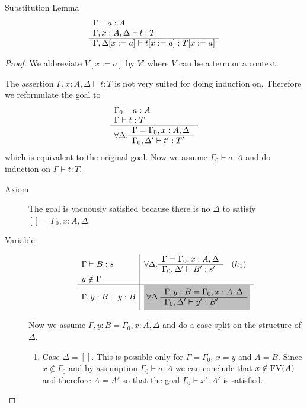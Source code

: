 \documentclass[12pt]{article}
\begin{document}
\begin{theorem} Substitution Lemma
  \label{substitutionlemma}
  $$
  \begin{array}{l}  \Gamma \vdash a:A
    \\
    \Gamma,x:A,\Delta \vdash t:T
   \\ \hline \Gamma,\Delta[x:=a] \vdash t[x:=a] : T[x:=a]\end{array}
  $$
  \begin{proof}
    We abbreviate $V[x:=a]$ by $V'$ where $V$ can be a term or a context.

    The assertion $\Gamma,x:A,\Delta \vdash t:T$ is not very suited for doing
    induction on. Therefore we reformulate the goal to
    $$
    \begin{array}{l} 
      \Gamma_0\vdash a:A
      \\
      \Gamma \vdash t : T
     \\ \hline \forall \Delta .
      \begin{array}{l} \Gamma = \Gamma_0,x:A,\Delta \\ \hline \Gamma_0,\Delta' \vdash t' : T'\end{array}
    \end{array}
    $$
    which is equivalent to the original goal. Now we assume $\Gamma_0\vdash
    a:A$ and do induction on $\Gamma \vdash t : T$.

    \begin{description}

    \item[Axiom] The goal is vacuously satisfied because there is no $\Delta$
      to satisfy $[] = \Gamma_0,x:A,\Delta$.

    \item[Variable]
      $$
      \begin{array}{l|l}
        \Gamma \vdash B:s
        & \forall \Delta .
          \rulev
          {\Gamma = \Gamma_0,x:A,\Delta}
          {\Gamma_0,\Delta' \vdash B' : s'} \quad(h_1)
        \\
        y \notin \Gamma
        \\
        \hline
        \Gamma,y:B \vdash y:B
        & \goalbg{
          \forall \Delta .
          \rulev
          {\Gamma,y:B = \Gamma_0,x:A,\Delta}
          {\Gamma_0,\Delta' \vdash y': B'}
          }
      \end{array}
      $$

      Now we assume $\Gamma,y:B = \Gamma_0,x:A,\Delta$ and do a case split on
      the structure of $\Delta$.
      \begin{enumerate}

      \item Case $\Delta = []$. This is possible only for $\Gamma = \Gamma_0$,
        $x=y$ and $A = B$. Since $x \notin \Gamma_0$ and by assumption
        $\Gamma_0 \vdash a:A$ we can conclude that $x \notin \text{FV}(A)$ and
        therefore $A = A'$ so that the goal $\Gamma_0 \vdash x': A'$ is
        satisfied.


\end{enumerate}
\end{description}
\end{proof}
\end{theorem}
\end{document}
